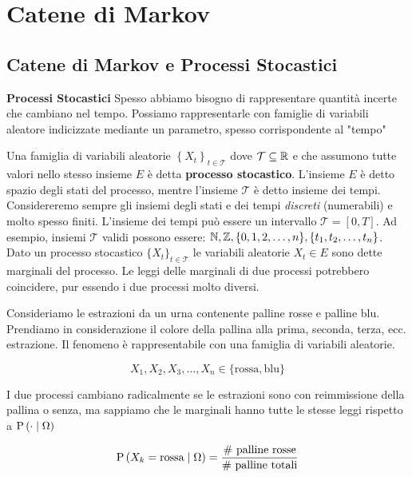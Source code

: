 \chapter{Catene di Markov}

\section{Catene di Markov e Processi Stocastici}

\begin{defn}
	\textbf{Processi Stocastici}
	Spesso abbiamo bisogno di rappresentare quantità incerte che cambiano nel tempo. Possiamo rappresentarle con famiglie di variabili aleatore indicizzate mediante un parametro, spesso corrispondente al "tempo"
	
	Una famiglia di variabili aleatorie $ \left\{X_t\right\}_{t\in \mathcal{T}} $ dove $ \mathcal{T} \subseteq \mathbb{R} $ e che assumono tutte valori nello stesso insieme $ E $ è detta \textbf{processo stocastico}. L'insieme $ E $ è detto spazio degli stati del processo, mentre l'insieme $ \mathcal{T} $ è detto insieme dei tempi. Considereremo sempre gli insiemi degli stati e dei tempi \textit{discreti} (numerabili) e molto spesso finiti. L'insieme dei tempi può essere un intervallo $ \mathcal{T} = [0,T] $. Ad esempio, insiemi $ \mathcal{T} $ validi possono essere: $ \mathbb{N}, \mathbb{Z}, \{0, 1, 2, \hdots, n\}, \{t_1, t_2, \hdots, t_n\} $. Dato un processo stocastico $ \{X_t\}_{t \in \mathcal{T}} $ le variabili aleatorie $ X_t \in E $ sono dette marginali del processo. Le leggi delle marginali di due processi potrebbero coincidere, pur essendo i due processi molto diversi.
	
\end{defn}


\begin{exmp}
	
	Consideriamo le estrazioni da un urna contenente palline rosse e palline blu. Prendiamo in considerazione il colore della pallina alla prima, seconda, terza, ecc. estrazione. Il fenomeno è rappresentabile con una famiglia di variabili aleatorie.
	
	\begin{equation*}
	X_1, X_2, X_3, \hdots, X_n \in \{\text{rossa}, \text{blu}\}
	\end{equation*}
	
	I due processi cambiano radicalmente se le estrazioni sono con reimmissione della pallina o senza, ma sappiamo che le marginali hanno tutte le stesse leggi rispetto a $ \text{P}\left(\cdot \mid \Omega\right) $
	
	\begin{equation*}
	\text{P}\left(X_k = \text{rossa} \mid \Omega\right) = \dfrac{\text{\# palline rosse}}{\text{\# palline totali}}
	\end{equation*}
	
\end{exmp}


